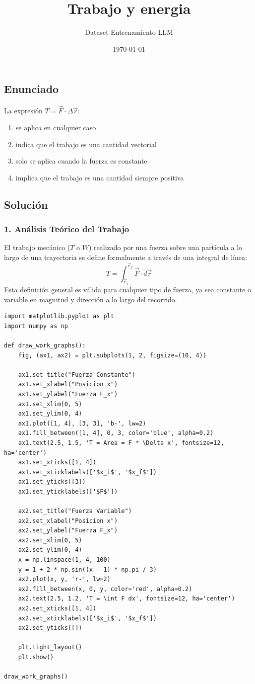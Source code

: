 \documentclass[12pt, a4paper]{article}
\title{Trabajo y energia}
\author{Dataset Entrenamiento LLM}
\date{\today}
\begin{document}
\subsection*{Enunciado}
La expresión $T = \vec{F} \cdot \Delta\vec{r}$:
\begin{enumerate}[label=\alph*.]
    \item se aplica en cualquier caso
    \item indica que el trabajo es una cantidad vectorial
    \item solo se aplica cuando la fuerza es constante
    \item implica que el trabajo es una cantidad siempre positiva
\end{enumerate}

\subsection*{Solución}

\subsubsection*{1. Análisis Teórico del Trabajo}
El trabajo mecánico ($T$ o $W$) realizado por una fuerza sobre una partícula a lo largo de una trayectoria se define formalmente a través de una integral de línea:
$$T = \int_{\vec{r}_i}^{\vec{r}_f} \vec{F} \cdot d\vec{r}$$
Esta definición general es válida para cualquier tipo de fuerza, ya sea constante o variable en magnitud y dirección a lo largo del recorrido.

\begin{lstlisting}
import matplotlib.pyplot as plt
import numpy as np

def draw_work_graphs():
    fig, (ax1, ax2) = plt.subplots(1, 2, figsize=(10, 4))
    
    ax1.set_title("Fuerza Constante")
    ax1.set_xlabel("Posicion x")
    ax1.set_ylabel("Fuerza F_x")
    ax1.set_xlim(0, 5)
    ax1.set_ylim(0, 4)
    ax1.plot([1, 4], [3, 3], 'b-', lw=2)
    ax1.fill_between([1, 4], 0, 3, color='blue', alpha=0.2)
    ax1.text(2.5, 1.5, 'T = Area = F * \Delta x', fontsize=12, ha='center')
    ax1.set_xticks([1, 4])
    ax1.set_xticklabels(['$x_i$', '$x_f$'])
    ax1.set_yticks([3])
    ax1.set_yticklabels(['$F$'])

    ax2.set_title("Fuerza Variable")
    ax2.set_xlabel("Posicion x")
    ax2.set_ylabel("Fuerza F_x")
    ax2.set_xlim(0, 5)
    ax2.set_ylim(0, 4)
    x = np.linspace(1, 4, 100)
    y = 1 + 2 * np.sin((x - 1) * np.pi / 3)
    ax2.plot(x, y, 'r-', lw=2)
    ax2.fill_between(x, 0, y, color='red', alpha=0.2)
    ax2.text(2.5, 1.2, 'T = \int F dx', fontsize=12, ha='center')
    ax2.set_xticks([1, 4])
    ax2.set_xticklabels(['$x_i$', '$x_f$'])
    ax2.set_yticks([])

    plt.tight_layout()
    plt.show()

draw_work_graphs()
\end{lstlisting}
\end{document}
